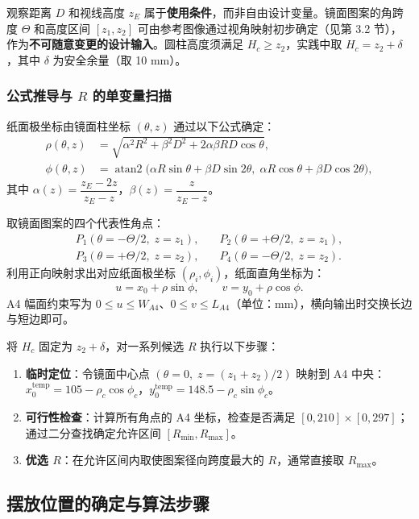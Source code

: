 \documentclass[12pt, a4paper]{ctexart}
\begin{document}
观察距离 $D$ 和视线高度 $z_E$ 属于\textbf{使用条件}，而非自由设计变量。镜面图案的角跨度 $\Theta$ 和高度区间 $[z_1,z_2]$ 可由参考图像通过视角映射初步确定（见第 3.2 节），作为\textbf{不可随意变更的设计输入}。圆柱高度须满足 $H_c\geq z_2$，实践中取 $H_c=z_2+\delta$，其中 $\delta$ 为安全余量（取 10 mm）。

\subsubsection{公式推导与 \texorpdfstring{$R$}{R} 的单变量扫描}

纸面极坐标由镜面柱坐标 $(\theta,z)$ 通过以下公式确定：
\[
\begin{aligned}
\rho(\theta,z)&=\sqrt{\alpha^2R^2+\beta^2D^2+2\alpha\beta RD\cos\theta},\\
\phi(\theta,z)&=\operatorname{atan2}\!\bigl(\alpha R\sin\theta+\beta D\sin2\theta,\;\alpha R\cos\theta+\beta D\cos2\theta\bigr),
\end{aligned}
\]
其中 $\alpha(z)=\dfrac{z_E-2z}{z_E-z}$，$\beta(z)=\dfrac{z}{z_E-z}$。

取镜面图案的四个代表性角点：
\[
\begin{aligned}
P_1(\theta=-\Theta/2,\;z=z_1),&\quad P_2(\theta=+\Theta/2,\;z=z_1),\\
P_3(\theta=+\Theta/2,\;z=z_2),&\quad P_4(\theta=-\Theta/2,\;z=z_2).
\end{aligned}
\]
利用正向映射求出对应纸面极坐标 $(\rho_i,\phi_i)$，纸面直角坐标为：
\[
u=x_0+\rho\sin\phi,\qquad v=y_0+\rho\cos\phi.
\]
A4 幅面约束写为 $0\leq u\leq W_{A4}$、$0\leq v\leq L_{A4}$（单位：mm），横向输出时交换长边与短边即可。

将 $H_c$ 固定为 $z_2+\delta$，对一系列候选 $R$ 执行以下步骤：
\begin{enumerate}
    \item \textbf{临时定位}：令镜面中心点 $(\theta=0,\;z=(z_1+z_2)/2)$ 映射到 A4 中央：$x_0^{\mathrm{temp}}=105-\rho_c\cos\phi_c$，$y_0^{\mathrm{temp}}=148.5-\rho_c\sin\phi_c$。
    \item \textbf{可行性检查}：计算所有角点的 A4 坐标，检查是否满足 $[0,210]\times[0,297]$；通过二分查找确定允许区间 $[R_{\min},R_{\max}]$。
    \item \textbf{优选 $R$}：在允许区间内取使图案径向跨度最大的 $R$，通常直接取 $R_{\max}$。
\end{enumerate}

\subsection{摆放位置的确定与算法步骤}
\end{document}
